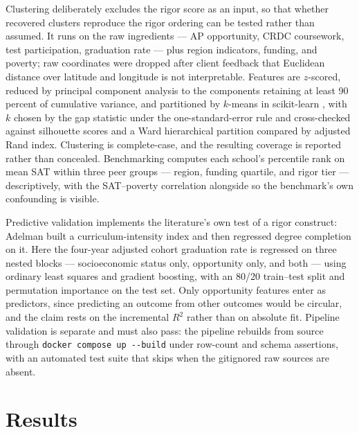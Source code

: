 \documentclass[12pt]{article}
\begin{document}
Clustering deliberately excludes the rigor score as an input, so that whether recovered clusters reproduce the rigor ordering can be tested rather than assumed. It runs on the raw ingredients --- AP opportunity, CRDC coursework, test participation, graduation rate --- plus region indicators, funding, and poverty; raw coordinates were dropped after client feedback that Euclidean distance over latitude and longitude is not interpretable. Features are $z$-scored, reduced by principal component analysis to the components retaining at least 90 percent of cumulative variance, and partitioned by $k$-means \citep{macqueen1967} in scikit-learn \citep{pedregosa2011}, with $k$ chosen by the gap statistic under the one-standard-error rule \citep{tibshirani2001} and cross-checked against silhouette scores \citep{rousseeuw1987} and a Ward hierarchical partition \citep{ward1963} compared by adjusted Rand index. Clustering is complete-case, and the resulting coverage is reported rather than concealed. Benchmarking computes each school's percentile rank on mean SAT within three peer groups --- region, funding quartile, and rigor tier --- descriptively, with the SAT--poverty correlation alongside so the benchmark's own confounding is visible.

Predictive validation implements the literature's own test of a rigor construct: Adelman built a curriculum-intensity index and then regressed degree completion on it. Here the four-year adjusted cohort graduation rate is regressed on three nested blocks --- socioeconomic status only, opportunity only, and both --- using ordinary least squares and gradient boosting, with an 80/20 train--test split and permutation importance on the test set. Only opportunity features enter as predictors, since predicting an outcome from other outcomes would be circular, and the claim rests on the incremental $R^2$ rather than on absolute fit. Pipeline validation is separate and must also pass: the pipeline rebuilds from source through \texttt{docker compose up -{}-build} under row-count and schema assertions, with an automated test suite that skips when the gitignored raw sources are absent.

\section{Results}
\label{sec:results}
\end{document}

